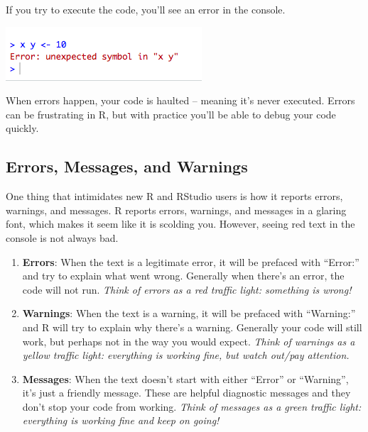 \documentclass[]{book}
\begin{document}
If you try to execute the code, you'll see an error in the console.

\begin{center}\includegraphics[width=0.7\linewidth]{img/error} \end{center}

When errors happen, your code is haulted -- meaning it's never executed. Errors can be frustrating in R, but with practice you'll be able to debug your code quickly.

\hypertarget{errors-messages-and-warnings}{%
\subsection{Errors, Messages, and Warnings}\label{errors-messages-and-warnings}}

One thing that intimidates new R and RStudio users is how it reports errors, warnings, and messages. R reports errors, warnings, and messages in a glaring font, which makes it seem like it is scolding you. However, seeing red text in the console is not always bad.

\begin{enumerate}
\def\labelenumi{\arabic{enumi}.}
\item
  \textbf{Errors}: When the text is a legitimate error, it will be prefaced with ``Error:'' and try to explain what went wrong. Generally when there's an error, the code will not run. \emph{Think of errors as a red traffic light: something is wrong!}
\item
  \textbf{Warnings}: When the text is a warning, it will be prefaced with ``Warning:'' and R will try to explain why there's a warning. Generally your code will still work, but perhaps not in the way you would expect. \emph{Think of warnings as a yellow traffic light: everything is working fine, but watch out/pay attention.}
\item
  \textbf{Messages}: When the text doesn't start with either ``Error'' or ``Warning'', it's just a friendly message. These are helpful diagnostic messages and they don't stop your code from working. \emph{Think of messages as a green traffic light: everything is working fine and keep on going!}
\end{enumerate}
\end{document}
